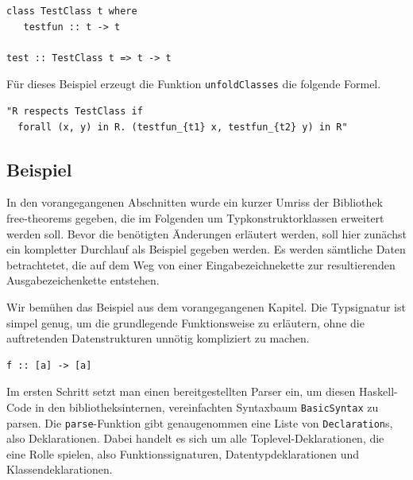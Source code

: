 \begin{verbatim}
class TestClass t where
   testfun :: t -> t

test :: TestClass t => t -> t
\end{verbatim}

Für dieses Beispiel erzeugt die Funktion \texttt{unfoldClasses} die folgende Formel.

\begin{verbatim}
"R respects TestClass if
  forall (x, y) in R. (testfun_{t1} x, testfun_{t2} y) in R"
\end{verbatim}

\subsection{Beispiel}

\label{sec:free-theorems-beispiel}

In den vorangegangenen Abschnitten wurde ein kurzer Umriss der Bibliothek free-theorems gegeben, die im Folgenden um
Typkonstruktorklassen erweitert werden soll. Bevor die benötigten Änderungen erläutert werden, soll hier zunächst ein
kompletter Durchlauf als Beispiel gegeben werden. Es werden sämtliche Daten betrachtetet, die auf dem Weg von einer
Eingabezeichnekette zur resultierenden Ausgabezeichenkette entstehen.


Wir bemühen das Beispiel aus dem vorangegangenen Kapitel. Die Typsignatur ist simpel genug,
um die grundlegende Funktionsweise zu erläutern, ohne die auftretenden Datenstrukturen unnötig kompliziert zu machen.

\begin{verbatim}
f :: [a] -> [a]
\end{verbatim}

Im ersten Schritt setzt man einen bereitgestellten Parser ein, um diesen Haskell-Code in den bibliotheksinternen, vereinfachten
Syntaxbaum \texttt{BasicSyntax} zu parsen. Die \texttt{parse}-Funktion gibt genaugenommen eine Liste von \texttt{Declaration}s, also Deklarationen. Dabei handelt es sich um alle Toplevel-Deklarationen, die eine Rolle spielen, also Funktionssignaturen,
Datentypdeklarationen und Klassendeklarationen.


